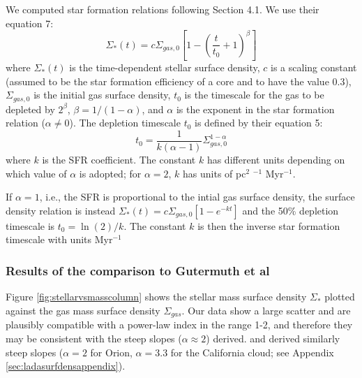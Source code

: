 \documentclass[twocolumn]{aastex61}
\begin{document}
We computed star formation relations following \citet{Gutermuth2011a} Section 4.1.
We use their equation 7:
\begin{equation}
    \label{eqn:stellarsurfdens}
    \Sigma_*(t) = c \Sigma_{gas,0} \left[1-\left(\frac{t}{t_0}+1\right)^\beta\right]
\end{equation}
where $\Sigma_*(t)$ is the time-dependent stellar surface density, $c$ is a
scaling constant (assumed to be the star formation efficiency of a core and
to have the value 0.3), $\Sigma_{gas,0}$ is the initial gas surface density,  $t_0$
is the timescale for the gas to be depleted by $2^{\beta}$, $\beta =
1/(1-\alpha)$, and $\alpha$ is
the exponent in the star formation relation ($\alpha\ne 0$).
The depletion timescale $t_0$ is defined by their equation 5:
\begin{equation}
    t_0 = \frac{1}{k(\alpha-1)} \Sigma_{gas,0}^{1-\alpha}
\end{equation}
where $k$ is the SFR coefficient.  The constant $k$ has
different units depending on which value of $\alpha$ is adopted;
for $\alpha=2$, $k$ has units of pc$^{2}$ \msun$^{-1}$ Myr$^{-1}$.

If $\alpha=1$, i.e., the SFR is proportional to the intial gas
surface density, the surface density relation is instead $\Sigma_*(t) = c
\Sigma_{gas,0}[1-e^{-kt}]$ and the 50\% depletion timescale is $t_0=\ln(2)/k$.
The constant $k$ is then the inverse star formation timescale with units
Myr$^{-1}$


\subsubsection{Results of the comparison to Gutermuth et al}
\label{sec:gutermuthcomparison}



Figure \ref{fig:stellarvsmasscolumn} shows the stellar mass surface density
$\Sigma_*$ plotted against the gas mass surface density $\Sigma_{gas}$.
Our data show a large scatter and are plausibly compatible with a
power-law index in the range 1-2, and therefore they may be consistent with the
steep slopes ($\alpha\approx2$) \citet{Gutermuth2011a} derived.
\citet{Lada2017a} and \citet{Lombardi2014a} derived similarly steep
slopes ($\alpha=2$ for Orion, $\alpha=3.3$ for the California cloud;
see Appendix \ref{sec:ladasurfdensappendix}).
\end{document}
